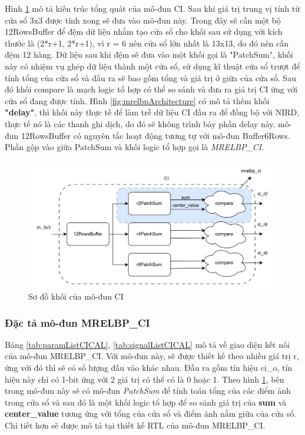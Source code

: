 Hình \ref{fig:ciArch} mô tả kiến trúc tổng quát của mô-đun CI. Sau khi giá trị trung vị tính từ cửa sổ 3x3 được tính xong sẽ đưa vào mô-đun này. Trong đây sẽ cần một bộ 12RowsBuffer để đệm dữ liệu nhằm tạo cửa sổ cho khối sau sử dụng với kích thước là (2*r+1, 2*r+1), vì r = 6 nên cửa sổ lớn nhất là 13x13, do đó nên cần đệm 12 hàng. Dữ liệu sau khi đệm sẽ đưa vào một khối gọi là "PatchSum", khối này có nhiệm vụ ghép dữ liệu thành một cửa sổ, sử dụng kĩ thuật cửa sổ trượt để tính tổng của cửa sổ và đầu ra sẽ bao gồm tổng và giá trị ở giữa của cửa sổ. Sau đó khối compare là mạch logic tổ hợp có thể so sánh và đưa ra giá trị CI ứng với cửa sổ đang được tính. Hình \ref{fig:mrelbpArchitecture} có mô tả thêm khối \textbf{"delay"}, thì khối này thực tế để làm trễ dữ liệu CI đầu ra để đồng bộ với NIRD, thực tế nó là các thanh ghi dịch, do đó sẽ không trình bày phần delay này. mô-đun 12RowsBuffer có nguyên tắc hoạt động tương tự với mô-đun Buffer6Rows. Phần gộp vào giữa PatchSum và khối logic tổ hợp gọi là \textit{MRELBP\_CI}. 

\begin{figure}[!ht]
    \centering
    \includegraphics[width=\linewidth]{figures/ciArch.png}
    \caption{Sơ đồ khối của mô-đun CI}
    \label{fig:ciArch}
\end{figure}

\subsubsection{Đặc tả mô-đun MRELBP\_CI}
Bảng \ref{tab:paramListCICAL}, \ref{tab:signalListCICAL} mô tả về giao diện kết nối của mô-đun MRELBP\_CI. Với mô-đun này, sẽ được thiết kế theo nhiều giá trị r, ứng với đó thì sẽ có số lượng đầu vào khác nhau. Đầu ra gồm tín hiệu ci\_o, tín hiệu này chỉ có 1-bit ứng với 2 giá trị có thể có là 0 hoặc 1. Theo hình \ref{fig:ciArch}, bên trong mô-đun này sẽ có mô-đun \textit{PatchSum} để tính toán tổng của các điểm ảnh trong cửa sổ và sau đó là một khối logic tổ hợp để so sánh giá trị của \textbf{sum} và \textbf{center\_value} tương ứng với tổng của cửa sổ và điểm ảnh nằm giữa của cửa sổ. Chi tiết hơn sẽ được mô tả tại thiết kế RTL của mô-đun MRELBP\_CI. 


